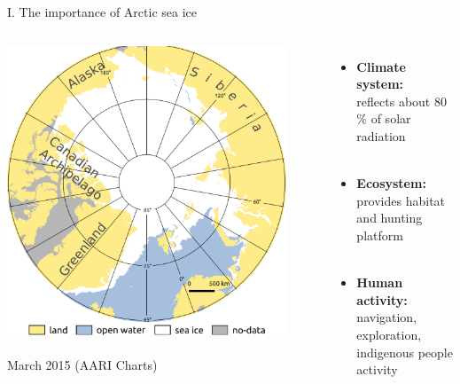 \documentclass[8pt]{beamer}
\newcommand\Fontvi{\fontsize{6}{7.2}\selectfont}
\begin{document}
\setwatermark{\fontsize{125pt}{125pt}\selectfont{}}
\begin{frame}[fragile]{I. The importance of Arctic sea ice}
	\begin{columns}
			\includegraphics[width=0.9\textwidth]{./img/ArcticSI_Mar2015_SI_names.pdf}\\~\\
		\Fontvi
		17 March 2015 (AARI Charts)
	\begin{itemize}
		\item \textbf{Climate system:}\\ reflects about 80$\%$ of solar radiation\\~\\
		\item \textbf{Ecosystem:}\\ provides habitat and hunting platform\\~\\
		\item \textbf{Human activity:}\\ navigation, exploration, indigenous people activity
	\end{itemize}
	\end{columns}
\end{frame}
\end{document}
